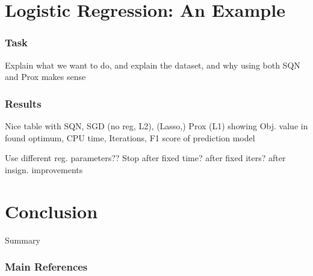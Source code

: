 \documentclass[10pt]{beamer}
\begin{document}
\section{Logistic Regression: An Example}
  \begin{frame}\frametitle{Task}
    Explain what we want to do, and explain the dataset,
    and why using both SQN and Prox makes sense   
  \end{frame}

  \begin{frame}\frametitle{Results}
    Nice table with SQN, SGD (no reg, L2), (Lasso,) Prox (L1) showing
    Obj. value in found optimum, CPU time, Iterations, F1 score of prediction model

    Use different reg. parameters??
    Stop after fixed time? after fixed iters? after insign. improvements  
  \end{frame}

\section{Conclusion}

  \begin{frame}{Summary}
    \begin{center}\ccbysa\end{center}
  \end{frame}


  \begin{frame}[allowframebreaks]\frametitle{Main References}

    
    

  \end{frame}
\end{document}

